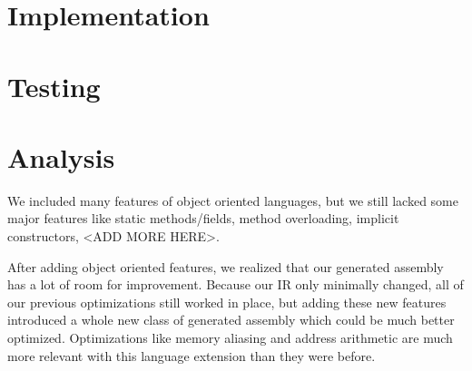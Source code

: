 \documentclass{article}
\begin{document}
\section{Implementation}

\section{Testing}

\section{Analysis}

We included many features of object oriented languages, but we still lacked some
major features like static methods/fields, method overloading, implicit
constructors, <ADD MORE HERE>.

After adding object oriented features, we realized that our generated assembly
has a lot of room for improvement. Because our IR only minimally changed, all of
our previous optimizations still worked in place, but adding these new features
introduced a whole new class of generated assembly which could be much better
optimized. Optimizations like memory aliasing and address arithmetic are much
more relevant with this language extension than they were before.
\end{document}
